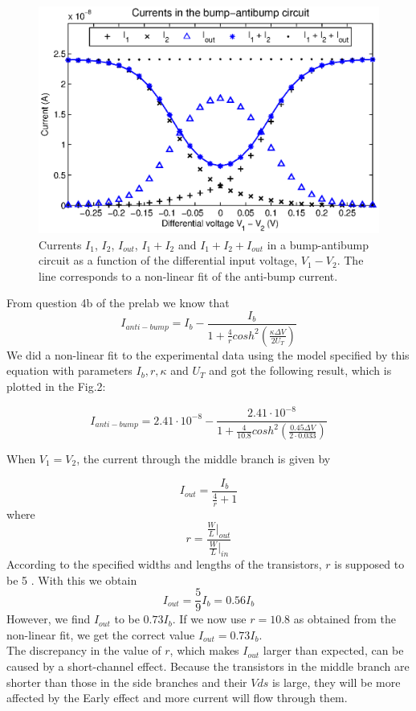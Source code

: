 \begin{figure}[!htb]
	\center
	\includegraphics{q2.eps}
	\caption{Currents \(I_1\), \(I_2\), \(I_{out}\), \(I_1+I_2\) and \(I_1+I_2+I_{out}\) in a bump-antibump circuit as a function of the differential input voltage, \(V_1-V_2\). The line corresponds to a non-linear fit of the anti-bump current.}
	\label{fig:ex2}
\end{figure}

From question 4b of the prelab we know that 
\begin{equation*}
I_{anti-bump} = I_b-\frac{I_b}{1+\frac{4}{r}cosh^2(\frac{\kappa \Delta V}{2U_T})}
\end{equation*}
We did a non-linear fit to the experimental data using the model specified by this equation with parameters \(I_b, r, \kappa\) and \(U_T\) and got the following result, which is plotted in the Fig.2:

\begin{equation*}
I_{anti-bump} = 2.41\cdot10^{-8}-\frac{2.41\cdot10^{-8}}{1+\frac{4}{10.8}cosh^2(\frac{0.45 \Delta V}{2\cdot0.033})}
\end{equation*}

When \(V_1=V_2\), the current through the middle branch is given by

\begin{equation*}
I_{out} = \frac{I_b}{\frac{4}{r}+1}
\end{equation*}
where 
\begin{equation*}
r = \frac{\frac{W}{L}\big|_{out}}{\frac{W}{L}\big|_{in}} 
\end{equation*}
According to the specified widths and lengths of the transistors, \(r\) is supposed to be 5 . With this we obtain
\begin{equation*}
I_{out} = \frac{5}{9}I_b=0.56I_b
\end{equation*}
However, we find \(I_{out}\) to be \(0.73I_b\).
If we now use \(r=10.8\) as obtained from the non-linear fit, we get the correct value \(I_{out}=0.73I_b\). \\

The discrepancy in the value of \(r\), which makes \(I_{out}\) larger than expected, can be caused by a short-channel effect. Because the transistors in the middle branch are shorter than those in the side branches and their \(Vds\) is large, they will be more affected by the Early effect and more current will flow through them. 




